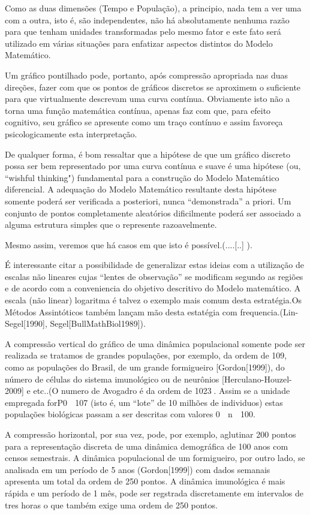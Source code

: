 {    Como as duas dimensões (Tempo e População), a principio, nada tem a ver uma com a outra, isto é, são independentes, não há absolutamente nenhuma razão para que tenham unidades transformadas pelo mesmo fator e este fato será utilizado em várias situações para enfatizar aspectos distintos do Modelo Matemático.

    Um gráfico pontilhado pode, portanto, após compressão apropriada nas duas direções, fazer com que os pontos de gráficos discretos se aproximem o suficiente para que virtualmente descrevam uma curva contínua. Obviamente isto não a torna uma função matemática contínua, apenas faz com que, para efeito cognitivo, seu gráfico se apresente como um traço contínuo e assim favoreça psicologicamente esta interpretação.

    De qualquer forma, é bom ressaltar que a hipótese de que um gráfico discreto possa ser bem representado por uma curva contínua e suave é uma hipótese (ou, ``wishful thinking") fundamental para a construção do Modelo Matemático diferencial. A adequação do Modelo Matemático resultante desta hipótese somente poderá ser verificada a posteriori, nunca ``demonstrada'' a priori. Um conjunto de pontos completamente aleatórios dificilmente poderá ser associado a alguma estrutura simples que o represente razoavelmente.

    Mesmo assim, veremos que há casos em que isto é possível.(....[..] ).

    É interessante citar a possibilidade de generalizar estas ideias com a utilização de escalas não lineares cujas ``lentes de observação'' se modificam segundo as regiões e de acordo com a conveniencia do objetivo descritivo do Modelo matemático. A escala (não linear) logaritma é talvez o exemplo mais comum desta estratégia.Os Métodos Assintóticos também lançam mão desta estatégia com frequencia.(Lin-Segel[1990], Segel[BullMathBiol1989]).

    A compressão vertical do gráfico de uma dinâmica populacional somente pode ser realizada se tratamos de grandes populações, por exemplo, da ordem de 109, como as populações do Brasil, de um grande formigueiro [Gordon[1999]), do número de células do sistema imunológico ou de neurônios [Herculano-Houzel-2009] e etc..(O numero de Avogadro é da ordem de 1023. Assim se a unidade empregada forP0  107 (isto é, um ``lote'' de 10 milhões de individuos) estas populações biológicas passam a ser descritas com valores 0  n  100.

    A compressão horizontal, por sua vez, pode, por exemplo, aglutinar 200 pontos para a representação discreta de uma dinâmica demográfica de 100 anos com censos semestrais. A dinâmica populacional de um formigueiro, por outro lado, se analisada em um período de 5 anos (Gordon[1999]) com dados semanais apresenta um total da ordem de 250 pontos. A dinâmica imunológica é mais rápida e um período de 1 mês, pode ser regstrada discretamente em intervalos de tres horas o que também exige uma ordem de 250 pontos.

}
